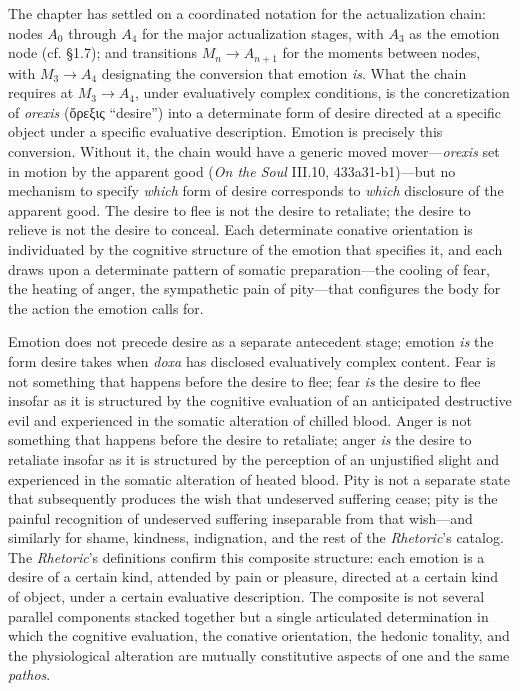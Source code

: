 \documentclass{article}
\newcommand{\gk}[1]{{\greekfont #1}}
\begin{document}
The chapter has settled on a coordinated notation for the actualization chain: nodes $A_0$ through $A_4$ for the major actualization stages, with $A_3$ as the emotion node (cf. \S 1.7); and transitions $M_n \rightarrow A_{n+1}$ for the moments between nodes, with $M_3 \rightarrow A_4$ designating the conversion that emotion \textit{is}. What the chain requires at $M_3 \rightarrow A_4$, under evaluatively complex conditions, is the concretization of \textit{orexis} (\gk{ὄρεξις} ``desire'') into a determinate form of desire directed at a specific object under a specific evaluative description. Emotion is precisely this conversion. Without it, the chain would have a generic moved mover---\textit{orexis} set in motion by the apparent good (\textit{On the Soul} III.10, 433a31-b1)---but no mechanism to specify \textit{which} form of desire corresponds to \textit{which} disclosure of the apparent good. The desire to flee is not the desire to retaliate; the desire to relieve is not the desire to conceal. Each determinate conative orientation is individuated by the cognitive structure of the emotion that specifies it, and each draws upon a determinate pattern of somatic preparation---the cooling of fear, the heating of anger, the sympathetic pain of pity---that configures the body for the action the emotion calls for.

Emotion does not precede desire as a separate antecedent stage; emotion \textit{is} the form desire takes when \textit{doxa} has disclosed evaluatively complex content. Fear is not something that happens before the desire to flee; fear \textit{is} the desire to flee insofar as it is structured by the cognitive evaluation of an anticipated destructive evil and experienced in the somatic alteration of chilled blood. Anger is not something that happens before the desire to retaliate; anger \textit{is} the desire to retaliate insofar as it is structured by the perception of an unjustified slight and experienced in the somatic alteration of heated blood. Pity is not a separate state that subsequently produces the wish that undeserved suffering cease; pity is the painful recognition of undeserved suffering inseparable from that wish---and similarly for shame, kindness, indignation, and the rest of the \textit{Rhetoric}'s catalog. The \textit{Rhetoric}'s definitions confirm this composite structure: each emotion is a desire of a certain kind, attended by pain or pleasure, directed at a certain kind of object, under a certain evaluative description. The composite is not several parallel components stacked together but a single articulated determination in which the cognitive evaluation, the conative orientation, the hedonic tonality, and the physiological alteration are mutually constitutive aspects of one and the same \textit{pathos}. 
\end{document}
